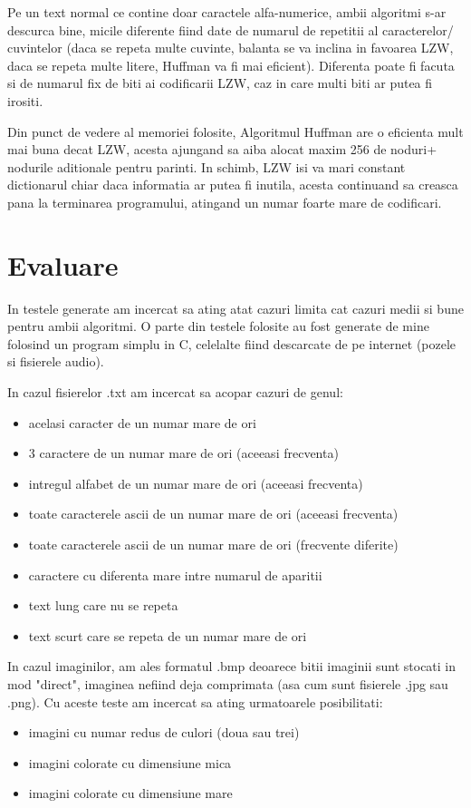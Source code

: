 \documentclass[runningheads]{llncs}
\begin{document}
Pe un text normal ce contine doar caractele alfa-numerice, ambii algoritmi s-ar descurca bine, micile diferente fiind date de numarul de repetitii al caracterelor/ cuvintelor (daca se repeta
multe cuvinte, balanta se va inclina in favoarea LZW, daca se repeta multe litere, Huffman va fi mai eficient). Diferenta poate fi facuta si de numarul fix de biti ai
codificarii LZW, caz in care multi biti ar putea fi irositi.

Din punct de vedere al memoriei folosite, Algoritmul Huffman are o eficienta mult mai buna decat LZW, acesta ajungand sa aiba alocat maxim 256 de noduri+ nodurile aditionale pentru parinti.
In schimb, LZW isi va mari constant dictionarul chiar daca informatia ar putea fi inutila, acesta continuand sa creasca pana la terminarea programului, atingand un numar foarte mare de codificari.


\section{Evaluare}

In testele generate am incercat sa ating atat cazuri limita cat cazuri medii si bune pentru ambii algoritmi.
O parte din testele folosite au fost generate de mine folosind un program simplu in C, celelalte fiind descarcate de pe internet (pozele si fisierele audio).

In cazul fisierelor .txt am incercat sa acopar cazuri de genul:
\begin{itemize}
    \item acelasi caracter de un numar mare de ori
    \item 3 caractere de un numar mare de ori (aceeasi frecventa)
    \item intregul alfabet de un numar mare de ori (aceeasi frecventa)
    \item toate caracterele ascii de un numar mare de ori (aceeasi frecventa)
    \item toate caracterele ascii de un numar mare de ori (frecvente diferite)
    \item caractere cu diferenta mare intre numarul de aparitii
    \item text lung care nu se repeta 
    \item text scurt care se repeta de un numar mare de ori
\end{itemize}

In cazul imaginilor, am ales formatul .bmp deoarece bitii imaginii sunt stocati in mod "direct", imaginea nefiind deja comprimata (asa cum sunt fisierele .jpg sau .png).
Cu aceste teste am incercat sa ating urmatoarele posibilitati:
\begin{itemize}
    \item imagini cu numar redus de culori (doua sau trei)
    \item imagini colorate cu dimensiune mica
    \item imagini colorate cu dimensiune mare
\end{itemize}
\end{document}
